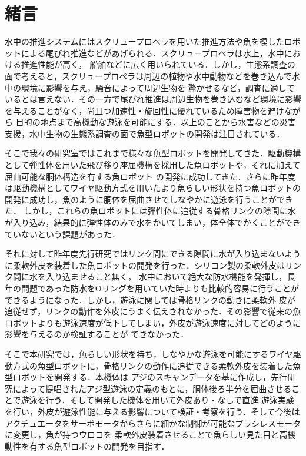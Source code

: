 \newpage
\setcounter{page}{1}
\section{緒言}
水中の推進システムにはスクリュープロペラを用いた推進方法や魚を模したロボットによる尾びれ推進などがあげられる\cite{ichi}．スクリュープロペラは水上，水中における推進性能が高く，
船舶などに広く用いられている．しかし，生態系調査の面で考えると，スクリュープロペラは周辺の植物や水中動物などを巻き込んで水中の環境に影響を与え，騒音によって周辺生物を
驚かせるなど，調査に適しているとは言えない．その一方で尾びれ推進は周辺生物を巻き込むなど環境に影響を与えることがなく，尚且つ加速性・旋回性に優れているため障害物を避けながら
目的の地点まで高機動な遊泳を可能にする．以上のことから水害などの災害支援，水中生物の生態系調査の面で魚型ロボットの開発は注目されている\cite{ni}\cite{san}．

そこで我々の研究室ではこれまで様々な魚型ロボットを開発してきた．駆動機構として弾性体を用いた飛び移り座屈機構を採用した魚ロボットや，それに加えて屈曲可能な胴体構造を有する魚ロボット
の開発に成功してきた．さらに昨年度は駆動機構としてワイヤ駆動方式を用いたより魚らしい形状を持つ魚ロボットの開発に成功し，魚のように胴体を屈曲させてしなやかに遊泳を行うことができた．
しかし，これらの魚ロボットには弾性体に追従する骨格リンクの隙間に水が入り込み，結果的に弾性体のみで水をかいてしまい，体全体でかくことができていないという課題があった．

それに対して昨年度先行研究ではリンク間にできる隙間に水が入り込まないように柔軟外皮を装着した魚ロボットの開発を行った．シリコン製の柔軟外皮はリンク間に水を入り込ませること無く，
水中において絶大な防水機能を発揮し，長年の問題であった防水をOリングを用いていた時よりも比較的容易に行うことができるようになった．しかし，遊泳に関しては骨格リンクの動きに柔軟外
皮が追従せず，リンクの動作を外皮にうまく伝えきれなかった．その影響で従来の魚ロボットよりも遊泳速度が低下してしまい，外皮が遊泳速度に対してどのように影響を与えるのか検証することが
できなかった．

そこで本研究では，魚らしい形状を持ち，しなやかな遊泳を可能にするワイヤ駆動方式の魚型ロボットに，骨格リンクの動作に追従できる柔軟外皮を装着した魚型ロボットを開発する．本機体は
アジのスキャンデータを基に作成し，先行研究によって提唱されたアジ型遊泳の定義のもとに，胴体後ろ半分を屈曲させることで遊泳を行う．そして開発した機体を用いて外皮あり・なしで直進
遊泳実験を行い，外皮が遊泳性能に与える影響について検証・考察を行う．そして今後はアクチュエータをサーボモータからさらに細かな制御が可能なブラシレスモータに変更し，魚が持つウロコを
柔軟外皮装着させることで魚らしい見た目と高機動性を有する魚型ロボットの開発を目指す．
